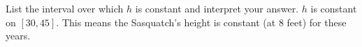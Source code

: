 {List the interval over which $h$ is constant and interpret your answer.}
{$h$ is constant on $[30,45]$.  This means the Sasquatch's height is constant (at 8 feet) for these years.}